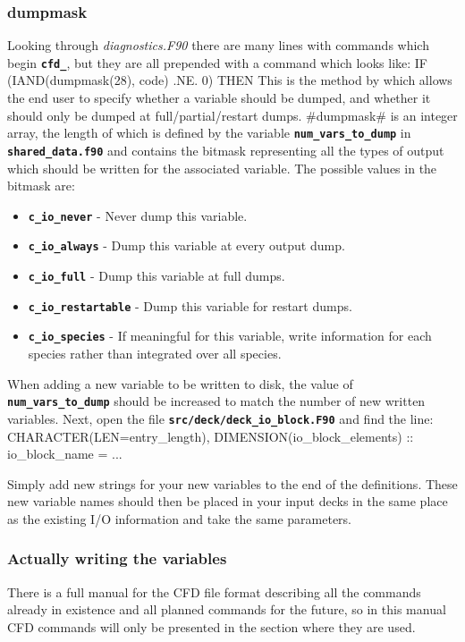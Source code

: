 \documentclass[12pt,a4paper]{article}
\newcommand{\inlinecode}[1]{{\color{warwickred} \bf\texttt{#1}}}
\newcommand{\EPOCH}{{\color{warwickdark}\fontfamily{phv}\selectfont{EPOCH}}}
\newenvironment{boxverbatim}{\lboxverbatim{none}}{\endlboxverbatim}
\begin{document}
\subsubsection{dumpmask}
Looking through {\it diagnostics.F90} there are many lines with commands which
begin \inlinecode{cfd\_}, but they are all prepended with a command which looks
like:
\begin{boxverbatim}
  IF (IAND(dumpmask(28), code) .NE. 0) THEN
\end{boxverbatim}
This is the method by which {\EPOCH} allows the end user to specify whether a
variable should be dumped, and whether it should only be dumped at
full/partial/restart dumps. #dumpmask# is an integer array, the length of which is
defined by the variable \inlinecode{num\_vars\_to\_dump} in
\inlinecode{shared\_data.f90} and contains the bitmask representing all the
types of output which should be written for the associated variable. The
possible values in the bitmask are:

\begin{itemize}
\item \inlinecode{c\_io\_never} - Never dump this variable.
\item \inlinecode{c\_io\_always} - Dump this variable at every output dump.
\item \inlinecode{c\_io\_full} - Dump this variable at full dumps.
\item \inlinecode{c\_io\_restartable} - Dump this variable for restart dumps.
\item \inlinecode{c\_io\_species} - If meaningful for this variable, write
  information for each species rather than integrated over all species.
\end{itemize}

When adding a new variable to be written to disk, the value of
\inlinecode{num\_vars\_to\_dump} should be increased to match the number of new
written variables. Next, open the file \inlinecode{src/deck/deck\_io\_block.F90}
and find the line:
\begin{boxverbatim}
  CHARACTER(LEN=entry_length), DIMENSION(io_block_elements) :: io_block_name =  ...
\end{boxverbatim}

Simply add new strings for your new variables to the end of the
definitions. These new variable names should then be placed in your input decks
in the same place as the existing I/O information and take the same parameters.

\subsubsection{Actually writing the variables}
There is a full manual for the CFD file format describing all the commands
already in existence and all planned commands for the future, so in this
manual CFD commands will only be presented in the section where they are used.
\end{document}
